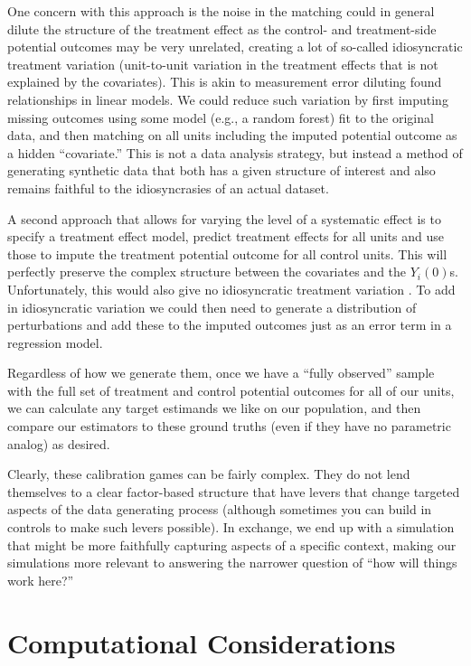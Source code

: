 \documentclass[
]{book}
\begin{document}
One concern with this approach is the noise in the matching could in general dilute the structure of the treatment effect as the control- and treatment-side potential outcomes may be very unrelated, creating a lot of so-called idiosyncratic treatment variation (unit-to-unit variation in the treatment effects that is not explained by the covariates).
This is akin to measurement error diluting found relationships in linear models.
We could reduce such variation by first imputing missing outcomes using some model (e.g., a random forest) fit to the original data, and then matching on all units including the imputed potential outcome as a hidden ``covariate.''
This is not a data analysis strategy, but instead a method of generating synthetic data that both has a given structure of interest and also remains faithful to the idiosyncrasies of an actual dataset.

A second approach that allows for varying the level of a systematic effect is to specify a treatment effect model, predict treatment effects for all units and use those to impute the treatment potential outcome for all control units.
This will perfectly preserve the complex structure between the covariates and the \(Y_i(0)\)s.
Unfortunately, this would also give no idiosyncratic treatment variation .
To add in idiosyncratic variation we could then need to generate a distribution of perturbations and add these to the imputed outcomes just as an error term in a regression model.

Regardless of how we generate them, once we have a ``fully observed'' sample with the full set of treatment and control potential outcomes for all of our units, we can calculate any target estimands we like on our population, and then compare our estimators to these ground truths (even if they have no parametric analog) as desired.

Clearly, these calibration games can be fairly complex.
They do not lend themselves to a clear factor-based structure that have levers that change targeted aspects of the data generating process (although sometimes you can build in controls to make such levers possible).
In exchange, we end up with a simulation that might be more faithfully capturing aspects of a specific context, making our simulations more relevant to answering the narrower question of ``how will things work here?''

\part{Computational Considerations}\label{part-computational-considerations}
\end{document}
